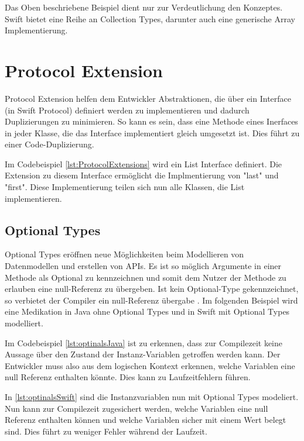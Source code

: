 Das Oben beschriebene Beispiel dient nur zur Verdeutlichung den Konzeptes. Swift bietet eine Reihe an Collection Types, darunter auch eine generische Array Implementierung. 

\section{Protocol Extension}
Protocol Extension helfen dem Entwickler Abstraktionen, die über ein Interface (in Swift Protocol) definiert werden zu implementieren und dadurch Duplizierungen zu minimieren. So kann es sein, dass eine Methode eines Inerfaces in jeder Klasse, die das Interface implementiert gleich umgesetzt ist. Dies führt zu einer Code-Duplizierung. 

Im Codebeispiel \ref{lst:ProtocolExtensions} wird ein List Interface definiert. Die Extension zu diesem Interface ermöglicht die Implmentierung von "last" und "first". Diese Implementierung teilen sich nun alle Klassen, die List implementieren.

\subsection{Optional Types}
Optional Types eröffnen neue Möglichkeiten beim Modellieren von Datenmodellen und erstellen von APIs. Es ist so möglich Argumente in einer Methode als Optional zu kennzeichnen und somit dem Nutzer der Methode zu erlauben eine null-Referenz zu übergeben. Ist kein Optional-Type gekennzeichnet, so verbietet der Compiler ein null-Referenz übergabe \cite{Apple:2014sp}. Im folgenden Beispiel wird eine Medikation in Java ohne Optional Types und in Swift mit Optional Types modelliert.
 

Im Codebeispiel \ref{lst:optinalsJava} ist zu erkennen, dass zur Compilezeit keine Aussage über den Zustand der Instanz-Variablen getroffen werden kann. Der Entwickler muss also aus dem logischen Kontext erkennen, welche Variablen eine null Referenz enthalten könnte. Dies kann zu Laufzeitfehlern führen.


In \ref{lst:optinalsSwift} sind die Instanzvariablen nun mit Optional Types modeliert. Nun 
kann zur Compilezeit zugesichert werden, welche Variablen eine null Referenz enthalten können und welche Variablen sicher mit einem Wert belegt sind. Dies führt zu weniger Fehler während der Laufzeit.

